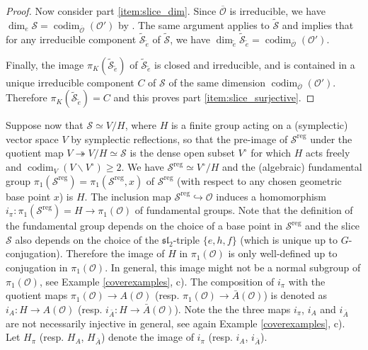 \documentclass{amsart}
\theoremstyle{definition}
\DeclareMathOperator{\codim}{codim}
\DeclareMathOperator{\reg}{reg}
\newcommand{\cS}{\mathcal{S}}
\newcommand{\Ab}{\bar{A}}
\newcommand{\0}{\mathcal{O}}
\begin{document}
\begin{proof}
Now consider part \ref{item:slice_dim}. Since $\overline{\0}$ is irreducible, we have $\dim_e \cS = \codim_{\overline{\0}}(\0')$ by \cite[\S\,12.4]{Kraft-Procesi:classical}. The same argument applies to $\widetilde{\cS}$ and implies that for any irreducible component $\widetilde{\cS}_{\widetilde{e}}$ of $\widetilde{\cS}$, we have $\dim_{\widetilde{e}} \widetilde{\cS}_{\widetilde{e}} = \codim_{\overline{\0}}(\0')$. 

Finally, the image $\pi_K(\widetilde{\cS}_{\widetilde{e}})$ of $\widetilde{\cS}_{\widetilde{e}}$ is closed and irreducible, and is contained in a unique irreducible component $C$ of $\cS$ of the same dimension $\codim_{\overline{\0}}(\0')$. Therefore $\pi_K(\widetilde{\cS}_{\widetilde{e}}) = C$ and this proves part \ref{item:slice_surjective}.
\end{proof}






Suppose now that $\cS \simeq V / H$, where $H$ is a finite group acting on a (symplectic) vector space $V$ by symplectic reflections, so that the pre-image of $\cS^{\reg}$ under the quotient map $V \twoheadrightarrow V/H \simeq \cS$ is the dense open subset $V^\circ$ for which $H$ acts freely and $\codim_V(V \backslash V^\circ) \geq 2$. We have $\cS^{\reg} \simeq V^\circ / H$ and the (algebraic) fundamental group $\pi_1(\cS^{\reg}) = \pi_1(\cS^{\reg}, x)$ of $\cS^{\reg}$ (with respect to any chosen geometric base point $x$) is $H$. The inclusion map $\cS^{\reg} \hookrightarrow \0$ induces a homomorphism $i_\pi: \pi_1(\cS^{\reg}) = H \to \pi_1(\0)$ of fundamental groups. Note that the definition of the fundamental group depends on the choice of a base point in $\cS^{\reg}$ and the slice $\cS$ also depends on the choice of the $\mathfrak{sl}_2$-triple $\{ e,h,f\}$ (which is unique up to $G$-conjugation). Therefore the image of $H$ in $\pi_1(\0)$ is only well-defined up to conjugation in $\pi_1(\0)$. In general, this image might not be a normal subgroup of $\pi_1(\0)$, see Example \ref{coverexamples}, c).
The composition of $i_\pi$ with the quotient maps $\pi_1(\0) \to A(\0)$ (resp. $\pi_1(\0) \to \Ab(\0)$) is denoted as $i_A: H \to A(\0)$ (resp. $i_{\Ab}: H \to \Ab(\0)$). Note the the three maps $i_\pi$, $i_A$ and $i_{\Ab}$ are not necessarily injective in general, see again Example \ref{coverexamples}, c). Let $H_\pi$ (resp. $H_A$, $H_{\Ab}$) denote the image of $i_\pi$ (resp. $i_A$, $i_{\Ab}$).
\end{document}
